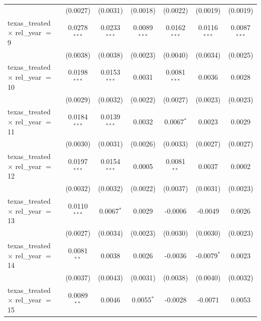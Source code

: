 \begin{tabular}{lcccccc}
                                                & (0.0027)       & (0.0031)       & (0.0018)        & (0.0022)        & (0.0019)        & (0.0019)\\   
   texas\_treated $\times$ rel\_year $=$ 9      & 0.0278$^{***}$ & 0.0233$^{***}$ & 0.0089$^{***}$  & 0.0162$^{***}$  & 0.0116$^{***}$  & 0.0087$^{***}$\\   
                                                & (0.0038)       & (0.0038)       & (0.0023)        & (0.0040)        & (0.0034)        & (0.0025)\\   
   texas\_treated $\times$ rel\_year $=$ 10     & 0.0198$^{***}$ & 0.0153$^{***}$ & 0.0031          & 0.0081$^{***}$  & 0.0036          & 0.0028\\   
                                                & (0.0029)       & (0.0032)       & (0.0022)        & (0.0027)        & (0.0023)        & (0.0023)\\   
   texas\_treated $\times$ rel\_year $=$ 11     & 0.0184$^{***}$ & 0.0139$^{***}$ & 0.0032          & 0.0067$^{*}$    & 0.0023          & 0.0029\\   
                                                & (0.0030)       & (0.0031)       & (0.0026)        & (0.0033)        & (0.0027)        & (0.0027)\\   
   texas\_treated $\times$ rel\_year $=$ 12     & 0.0197$^{***}$ & 0.0154$^{***}$ & 0.0005          & 0.0081$^{**}$   & 0.0037          & 0.0002\\   
                                                & (0.0032)       & (0.0032)       & (0.0022)        & (0.0037)        & (0.0031)        & (0.0023)\\   
   texas\_treated $\times$ rel\_year $=$ 13     & 0.0110$^{***}$ & 0.0067$^{*}$   & 0.0029          & -0.0006         & -0.0049         & 0.0026\\   
                                                & (0.0027)       & (0.0034)       & (0.0023)        & (0.0030)        & (0.0030)        & (0.0023)\\   
   texas\_treated $\times$ rel\_year $=$ 14     & 0.0081$^{**}$  & 0.0038         & 0.0026          & -0.0036         & -0.0079$^{*}$   & 0.0023\\   
                                                & (0.0037)       & (0.0043)       & (0.0031)        & (0.0038)        & (0.0040)        & (0.0032)\\   
   texas\_treated $\times$ rel\_year $=$ 15     & 0.0089$^{**}$  & 0.0046         & 0.0055$^{*}$    & -0.0028         & -0.0071         & 0.0053\\   

\end{tabular}
